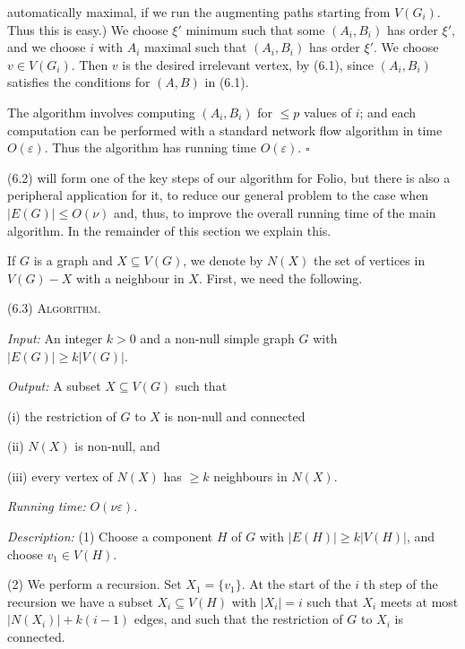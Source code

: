 \noindent automatically maximal, if we run the augmenting paths starting from $V(G_i)$. Thus this is easy.) We choose $\xi'$ minimum such that some $(A_i, B_i)$ has order $\xi'$, and we choose $i$ with $A_i$ maximal such that $(A_i, B_i)$ has order $\xi'$. We choose $v \in V(G_i)$. Then $v$ is the desired irrelevant vertex, by (6.1), since $(A_i, B_i)$ satisfies the conditions for $(A, B)$ in (6.1).

The algorithm involves computing $(A_i, B_i)$ for $\le p$ values of $i$; and each computation can be performed with a standard network flow algorithm in time $O(\varepsilon)$. Thus the algorithm has running time $O(\varepsilon)$. $\square$

\stmt
(6.2) will form one of the key steps of our algorithm for Folio, but there is also a peripheral application for it, to reduce our general problem to the case when $|E(G)| \le O(\nu)$ and, thus, to improve the overall running time of the main algorithm. In the remainder of this section we explain this.

If $G$ is a graph and $X \subseteq V(G)$, we denote by $N(X)$ the set of vertices in $V(G) - X$ with a neighbour in $X$. First, we need the following.

\stmt
(6.3) \textsc{Algorithm}.

\textit{Input:} An integer $k > 0$ and a non-null simple graph $G$ with $|E(G)| \ge k |V(G)|$.

\textit{Output:} A subset $X \subseteq V(G)$ such that

\hspace*{12pt}(i) the restriction of $G$ to $X$ is non-null and connected

\hspace*{12pt}(ii) $N(X)$ is non-null, and

\hspace*{12pt}(iii) every vertex of $N(X)$ has $\ge k$ neighbours in $N(X)$.

\textit{Running time:} $O(\nu\varepsilon)$.

\textit{Description:} (1) Choose a component $H$ of $G$ with $|E(H)| \ge k |V(H)|$, and choose $v_1 \in V(H)$.

\hspace*{12pt}(2) We perform a recursion. Set $X_1 = \{v_1\}$. At the start of the $i$ th step of the recursion we have a subset $X_i \subseteq V(H)$ with $|X_i| = i$ such that $X_i$ meets at most $|N(X_i)| + k(i - 1)$ edges, and such that the restriction of $G$ to $X_i$ is connected.

